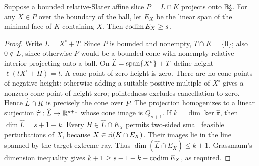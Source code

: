 \begin{lemma}\label{lem:face-codim}
Suppose a bounded relative-Slater affine slice $P=L\cap K$ projects onto
$\mathbb B_2^s$. For any $X\in P$ over the boundary of the ball, let $E_X$ be the linear
span of the minimal face of $K$ containing $X$. Then
$\operatorname{codim} E_X\geq s$.
\end{lemma}
\begin{proof}
Write $L=X^\circ+T$. Since $P$ is bounded and nonempty,
$T\cap K=\{0\}$; also $0\notin L$, since otherwise $P$ would be a
bounded cone with nonempty relative interior projecting onto a ball.
On $\widehat L=\operatorname{span}\{X^\circ\}+T$ define height
$\ell(tX^\circ+H)=t$. A cone point of zero height is zero.
There are no cone points of negative height: otherwise adding a suitable
positive multiple of $X^\circ$ gives a nonzero cone point of height zero;
pointedness excludes cancellation to zero. Hence
$\widehat L\cap K$ is precisely the cone over $P$.
The projection homogenizes to a linear surjection
$\widehat\pi:\widehat L\to\mathbb R^{s+1}$ whose cone image is $Q_{s+1}$.
If $k=\dim\ker\widehat\pi$, then $\dim\widehat L=s+1+k$.
Every $H\in\widehat L\cap E_X$ permits two-sided small feasible
perturbations of $X$, because $X\in\operatorname{ri}(K\cap E_X)$. Their images lie
in the line spanned by the target extreme ray. Thus
$\dim(\widehat L\cap E_X)\leq k+1$.
Grassmann's dimension inequality gives
$k+1\geq s+1+k-\operatorname{codim} E_X$, as required.
\end{proof}

